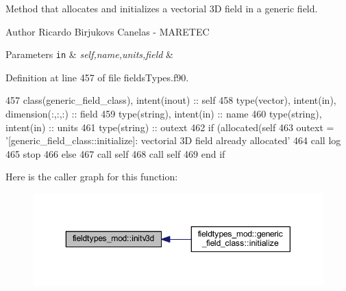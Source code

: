 Method that allocates and initializes a vectorial 3D field in a generic field. 

\begin{DoxyAuthor}{Author}
Ricardo Birjukovs Canelas -\/ M\+A\+R\+E\+T\+EC 
\end{DoxyAuthor}

\begin{DoxyParams}[1]{Parameters}
\mbox{\tt in}  & {\em self,name,units,field} & \\
\hline
\end{DoxyParams}


Definition at line 457 of file fields\+Types.\+f90.


\begin{DoxyCode}
457     \textcolor{keywordtype}{class}(generic\_field\_class), \textcolor{keywordtype}{intent(inout)} :: self
458     \textcolor{keywordtype}{type}(vector), \textcolor{keywordtype}{intent(in)}, \textcolor{keywordtype}{dimension(:,:,:)} :: field
459     \textcolor{keywordtype}{type}(string), \textcolor{keywordtype}{intent(in)} :: name
460     \textcolor{keywordtype}{type}(string), \textcolor{keywordtype}{intent(in)} :: units
461     \textcolor{keywordtype}{type}(string) :: outext
462     \textcolor{keywordflow}{if} (\textcolor{keyword}{allocated}(self%
463         outext = \textcolor{stringliteral}{'[generic\_field\_class::initialize]: vectorial 3D field already allocated'}
464         \textcolor{keyword}{call }log%
465         stop
466     \textcolor{keywordflow}{else}
467         \textcolor{keyword}{call }self%
468         \textcolor{keyword}{call }self%
469 \textcolor{keywordflow}{    end if}
\end{DoxyCode}
Here is the caller graph for this function\+:\nopagebreak
\begin{figure}[H]
\begin{center}
\leavevmode
\includegraphics[width=350pt]{namespacefieldtypes__mod_aa0a152c9e5131d3003cc34e4f3b2974d_icgraph}
\end{center}
\end{figure}
\mbox{\label{namespacefieldtypes__mod_a08d665678bea0956a323d08863e164e5}} 
